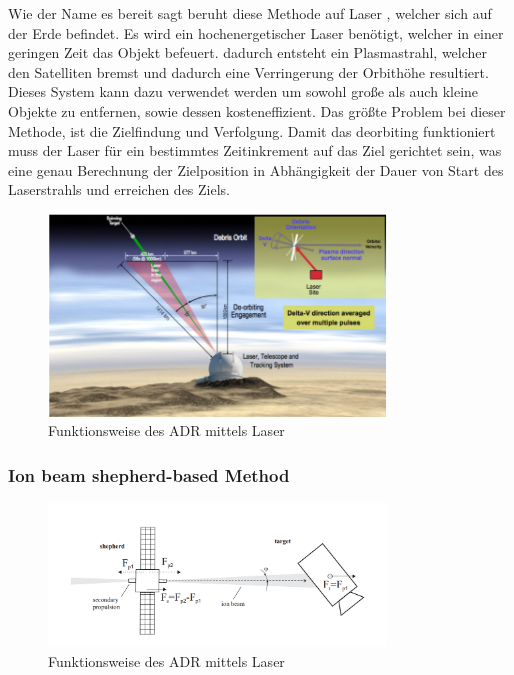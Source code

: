 	Wie der Name es bereit sagt beruht diese Methode auf Laser , welcher sich auf der Erde befindet. Es wird ein hochenergetischer Laser benötigt, welcher in einer geringen Zeit das Objekt befeuert. dadurch entsteht ein Plasmastrahl, welcher den Satelliten bremst und dadurch eine Verringerung der Orbithöhe resultiert. Dieses System kann dazu verwendet werden um sowohl große als auch kleine Objekte zu entfernen, sowie dessen kosteneffizient. Das größte Problem bei dieser Methode, ist die Zielfindung und Verfolgung. Damit das deorbiting funktioniert muss der Laser für ein bestimmtes Zeitinkrement auf das Ziel gerichtet sein, was eine genau Berechnung der Zielposition in Abhängigkeit der Dauer von Start des Laserstrahls und erreichen des Ziels.\cite{Phipps.2012,Mark.2019}
	
	\begin{figure}[h]
			\centering
					\includegraphics[width=0.80\textwidth]{./graphics/ADR/Laser-beam.PNG}
				\caption{Funktionsweise des ADR mittels Laser \cite{Phipps.2012}}
				\label{fig:Laser}
			\end{figure}

\subsubsection{Ion beam shepherd-based Method}
	\begin{figure}[h]
			\centering
					\includegraphics[width=0.80\textwidth]{./graphics/ADR/Shepherd.PNG}
				\caption{Funktionsweise des ADR mittels Laser \cite{Bombardelli.2011}}
				\label{fig:Laser}
			\end{figure}

